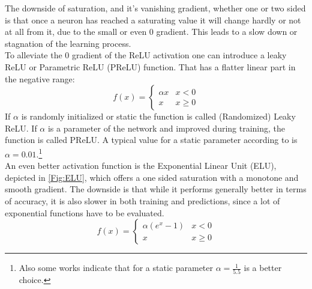 				The downside of saturation, and it's vanishing gradient, whether one or two sided is that once a neuron has reached a saturating value it will change hardly or not at all from it, due to the small or even 0 gradient. This leads to a slow down or stagnation of the learning process.\\
				To alleviate the 0 gradient of the ReLU activation one can introduce a leaky ReLU or Parametric ReLU (PReLU) function. That has a flatter linear part in the negative range:
				\begin{equation}
					f(x) =
					\begin{cases}
						\alpha x & x < 0\\
						x & x \geq 0
					\end{cases}
					\label{EQ:PReLU}
				\end{equation}
				If $\alpha$ is randomly initialized or static the function is called (Randomized) Leaky ReLU. If $\alpha$ is a parameter of the network and improved during training, the function is called PReLU. A typical value for a static parameter according to \cite{VanGrad} is $\alpha = 0.01$.\footnote{Also some works indicate that for a static parameter $\alpha = \frac{1}{5.5}$ is a better choice.}\\
				An even better activation function is the Exponential Linear Unit (ELU), depicted in \ref{Fig:ELU}, which offers a one sided saturation with a monotone and smooth gradient. The downside is that while it performs generally better in terms of accuracy, it is also slower in both training and predictions, since a lot of exponential functions have to be evaluated.\\
				\begin{equation}
				f(x) =
					\begin{cases}
						\alpha (e^x - 1) & x < 0 \\
						x & x \geq 0
					\end{cases}
				\end{equation}
